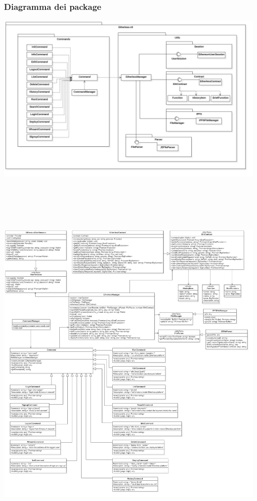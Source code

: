 \subsubsection{Diagramma dei package}

\begin{landscape}
	\includegraphics[scale=0.3]{diagrammi/etherless-cli/package.png}
\end{landscape}

\centerline{\includegraphics[height=19cm, width=16cm]{diagrammi/etherless-cli/classi.png}}

